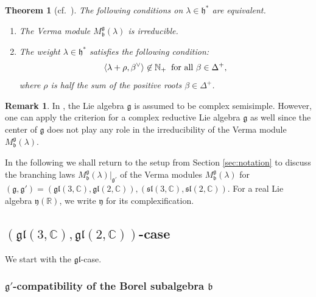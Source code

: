 \documentclass[a4paper,11pt,reqno]{amsart}
\newcommand{\frakg}{\mathfrak{g}}
\newcommand{\frakh}{\mathfrak{h}}
\newcommand{\CC}{\mathbb{C}}
\newcommand{\0}{{\bf 0}}
\newcommand{\N}{\mathbb{N}}
\newcommand{\R}{\mathbb{R}}
\newcommand{\C}{\mathbb{C}}
\newcommand{\1}{{\bf 1}}
\newcommand{\frakb}{{\mathfrak b}}
\newcommand{\Mb}{M^{\frakg}_{\frakb}}
\theoremstyle{plain}
\newtheorem{theorem}[equation]{Theorem}
\theoremstyle{definition}
\newtheorem{remark}[equation]{Remark}
\numberwithin{equation}{section}
\theoremstyle{definition}
\begin{document}
\begin{theorem}[{cf.\ \cite[Thm.\ 4.4]{Hum08}}]\label{thm:VermaCriterion}
The following conditions on $\lambda \in \frakh^*$ are equivalent.
\begin{enumerate}[label=\normalfont{(\roman*)}]
\item
The Verma module $\Mb(\lambda)$ is irreducible. 
\vspace{3pt}

\item
The weight $\lambda \in \frakh^*$ satisfies the following condition:
\begin{equation}\label{eqn:VermaCriterion}
\langle\lambda+\rho,\beta^\vee\rangle 
\not\in \N_+
\;\;
\textnormal{for all $\beta \in \Delta^+$},
\end{equation}
where $\rho$ is half the sum of the positive roots $\beta \in \Delta^+$.
\end{enumerate}
\end{theorem}

\begin{remark}\label{rem:VermaCriterion}
In \cite[Thm.\ 4.4]{Hum08}, the Lie algebra $\frakg$ is assumed to be 
complex semisimple. However, one can apply the criterion for a complex 
reductive Lie algebra $\frakg$ as well since the center of $\frakg$ does not 
play any role in the irreducibility of the Verma module 
$\Mb(\lambda)$.
\end{remark}

In the following
we shall return to the setup from
Section \ref{sec:notation} to 
discuss the branching laws $\Mb(\lambda)\vert_{\frakg'}$
of the Verma modules $\Mb(\lambda)$
for $(\mathfrak{g}, \mathfrak{g}')= (\mathfrak{gl}(3,\CC),
\mathfrak{gl}(2,\CC)), (\mathfrak{sl}(3,\CC), \mathfrak{sl}(2,\CC))$.
For a real Lie algebra $\mathfrak{y}(\R)$, 
we write $\mathfrak{y}$ 
for its complexification.

\subsection{\texorpdfstring{$(\mathfrak{gl}(3,\C), \mathfrak{gl}(2,\C))$}{(gl(3,C),gl(2,C))}-case}
\label{sec:glgl}

We start with the $\mathfrak{gl}$-case.

\subsubsection{\texorpdfstring{$\frakg'$}{g}-compatibility of the Borel subalgebra \texorpdfstring{$\frakb$}{b}}
\label{sec:BorelGL}
\end{document}
